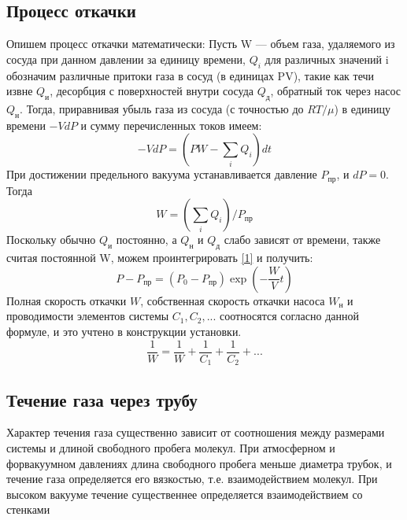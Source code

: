 \documentclass[a4paper, 12pt]{article}
\begin{document}
\subsection{Процесс откачки}
Опишем процесс откачки математически: 
Пусть W --- объем газа, удаляемого из сосуда при данном давлении за единицу времени, $Q_i$ для различных значений i обозначим различные притоки газа в сосуд (в единицах PV), такие как течи извне $Q_\text{и}$, десорбция с поверхностей внутри сосуда $Q_\text{д}$, обратный ток через насос $Q_\text{н}$. Тогда, приравнивая убыль газа из сосуда (с точностью до $RT/\mu$) в единицу времени $-VdP$ и сумму перечисленных токов имеем:
 \begin{equation}\label{1}
 	-VdP = (PW - \sum_i Q_i)dt
 \end{equation}
 При достижении предельного вакуума устанавливается давление $P_{\text{пр}}$, и $dP = 0$. Тогда
 \begin{equation}\label{2}
 	 W = ( \sum_i Q_i )/P_{\text{пр}}
 \end{equation}
 Поскольку обычно $Q_\text{и}$ постоянно, а $Q_\text{н}$ и $Q_\text{д}$ слабо зависят от времени, также считая постоянной W, можем проинтегрировать \eqref{1} и получить:
 \begin{equation}\label{3}
 	P - P_{\text{пр}} = (P_0 - P_{\text{пр}})\exp(-\frac{W}{V}t)
 \end{equation}
Полная скорость откачки $W$, собственная скорость откачки насоса $W_{\text{н}}$ и проводимости элементов системы $C_1, C_2,...$ соотносятся согласно данной формуле, и это учтено в конструкции установки.
 \begin{equation}\label{4}
 \frac{1}{W} = \frac{1}{W} + \frac{1}{C_1} + \frac{1}{C_2} + ...
\end{equation}

\subsection{Течение газа через трубу}
Характер течения газа существенно зависит от соотношения между размерами системы и длиной свободного пробега молекул. При атмосферном и форвакуумном давлениях  длина свободного пробега меньше диаметра трубок, и течение газа определяется его вязкостью, т.е. взаимодействием молекул. При высоком вакууме течение существеннее определяется взаимодействием со стенками \\
\end{document}
